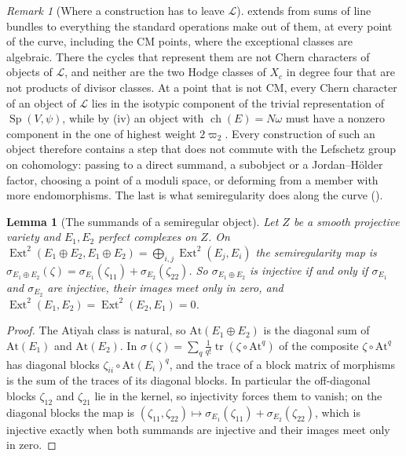 \documentclass[11pt,reqno]{amsart}
\theoremstyle{plain}
\newtheorem{lemma}[theorem]{Lemma}
\theoremstyle{definition}
\theoremstyle{remark}
\newtheorem{remark}[theorem]{Remark}
\DeclareMathOperator{\ch}{ch}
\DeclareMathOperator{\Ext}{Ext}
\DeclareMathOperator{\Sp}{Sp}
\begin{document}
\begin{remark}[Where a construction has to leave $\mathcal{L}$]
\label{rem:leavel}
 extends  from sums of
line bundles to everything the standard operations make out of them, at every
point of the curve, including the CM points, where the exceptional classes
are algebraic. There the cycles that represent them are not Chern characters
of objects of $\mathcal{L}$, and neither are the two Hodge classes of $X_{c}$
in degree four that are not products of divisor classes. At a point that is
not CM, every Chern character of an object of $\mathcal{L}$ lies in the
isotypic component of the trivial representation of $\Sp(V,\psi)$, while by
(iv) an object with $\ch(E)=N\omega$ must have a
nonzero component in the one of highest weight $2\varpi_{2}$. Every
construction of such an object therefore contains a step that does not commute with the Lefschetz group on
cohomology: passing to a direct summand, a subobject or a Jordan--H\"older
factor, choosing a point of a moduli space, or deforming from a member with
more endomorphisms. The last is what semiregularity does along the curve
().
\end{remark}

\begin{lemma}[The summands of a semiregular object]\label{lem:semiregsum}
Let $Z$ be a smooth projective variety and $E_{1},E_{2}$ perfect complexes on
$Z$. On $\Ext^{2}(E_{1}\oplus E_{2},E_{1}\oplus E_{2})=\bigoplus_{i,j}
\Ext^{2}(E_{j},E_{i})$ the semiregularity map is
$\sigma_{E_{1}\oplus E_{2}}(\zeta)=\sigma_{E_{1}}(\zeta_{11})
+\sigma_{E_{2}}(\zeta_{22})$. So $\sigma_{E_{1}\oplus E_{2}}$ is injective if
and only if $\sigma_{E_{1}}$ and $\sigma_{E_{2}}$ are injective, their images
meet only in zero, and $\Ext^{2}(E_{1},E_{2})=\Ext^{2}(E_{2},E_{1})=0$.
\end{lemma}

\begin{proof}
The Atiyah class is natural, so $\mathrm{At}(E_{1}\oplus E_{2})$ is the
diagonal sum of $\mathrm{At}(E_{1})$ and $\mathrm{At}(E_{2})$. In
$\sigma(\zeta)=\sum_{q}\frac1{q!}\operatorname{tr}(\zeta\circ\mathrm{At}^{q})$
of \cite[Theorem~2.2]{paperII} the composite $\zeta\circ\mathrm{At}^{q}$ has diagonal blocks
$\zeta_{ii}\circ\mathrm{At}(E_{i})^{q}$, and the trace of a block matrix of
morphisms is the sum of the traces of its diagonal blocks. In particular the
off-diagonal blocks $\zeta_{12}$ and $\zeta_{21}$ lie in the kernel, so
injectivity forces them to vanish; on the diagonal blocks the map is
$(\zeta_{11},\zeta_{22})\mapsto\sigma_{E_{1}}(\zeta_{11})+\sigma_{E_{2}}
(\zeta_{22})$, which is injective exactly when both summands are injective
and their images meet only in zero.
\end{proof}
\end{document}
